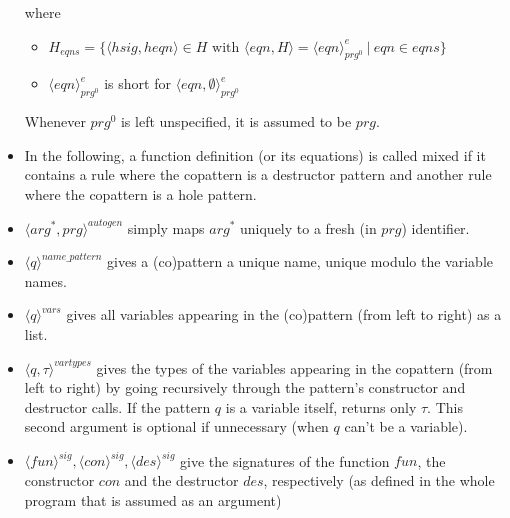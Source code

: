 \documentclass[11pt]{article} %
\begin{document}
\begin{itemize}
where
\begin{itemize}
\item $H_{eqns} = \{ \big\langle hsig, heqn \big\rangle \in H \textrm{ with } \big\langle eqn, H \big\rangle = \langle eqn \rangle^{e}_{prg^0} ~ | ~ eqn \in eqns \}$

\item $\langle eqn \rangle^{e}_{prg^0}$ is short for $\langle eqn, \emptyset \rangle^{e}_{prg^0}$
\end{itemize}

Whenever $prg^0$ is left unspecified, it is assumed to be $prg$.

\item In the following, a function definition (or its equations) is called mixed if it contains a rule where the copattern is a destructor pattern and another rule where the copattern is a hole pattern.

\item $\langle arg^*, prg \rangle^{autogen}$ simply maps $arg^*$ uniquely to a fresh (in $prg$) identifier.

\item $\langle q \rangle^{name\_pattern}$ gives a (co)pattern a unique name, unique modulo the variable names.

\item $\langle q \rangle^{vars}$ gives all variables appearing in the (co)pattern (from left to right) as a list.

\item $\langle q, \tau \rangle^{vartypes}$ gives the types of the variables appearing in the copattern (from left to right) by going recursively through the pattern's constructor and destructor calls. If the pattern $q$ is a variable itself, returns only $\tau$. This second argument is optional if unnecessary (when $q$ can't be a variable).

\item $\langle fun \rangle^{sig}, \langle con \rangle^{sig}, \langle des \rangle^{sig}$ give the signatures of the function $fun$, the constructor $con$ and the destructor $des$, respectively (as defined in the whole program that is assumed as an argument)


\end{itemize}
\end{document}
